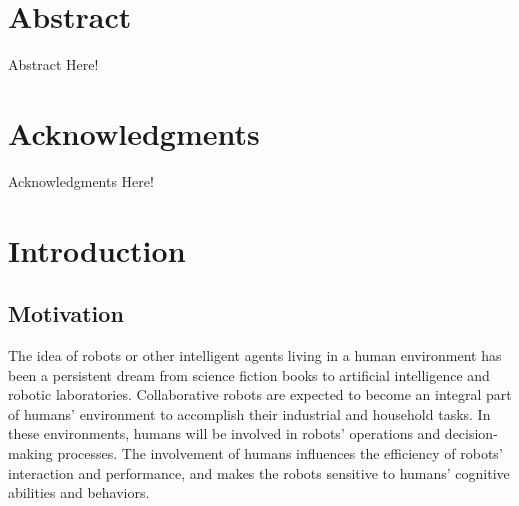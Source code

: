 \documentclass[12pt]{report}
\begin{document}

\chapter*{Abstract}

Abstract Here!

\pagebreak

\chapter*{Acknowledgments}

Acknowledgments Here!

\pagebreak

\tableofcontents
\pagebreak

\listoffigures
\pagebreak

\listoftables
\pagebreak



\chapter{Introduction}
\label{ch:introduction}

\section{Motivation}

The idea of robots or other intelligent agents living in a human environment has
been a persistent dream from science fiction books to artificial intelligence
and robotic laboratories. Collaborative robots are expected to become an
integral part of humans' environment to accomplish their industrial and
household tasks. In these environments, humans will be involved in robots'
operations and decision-making processes. The involvement of humans influences
the efficiency of robots' interaction and performance, and makes the robots
sensitive to humans' cognitive abilities and behaviors.
\end{document}
